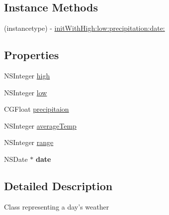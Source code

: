 \subsection*{Instance Methods}
\begin{DoxyCompactItemize}
\item 
(instancetype) -\/ \hyperlink{interface_weather_day_a5a57d195f2f06cb96693b4b4d68fd955}{init\-With\-High\-:low\-:precipitation\-:date\-:}
\end{DoxyCompactItemize}
\subsection*{Properties}
\begin{DoxyCompactItemize}
\item 
N\-S\-Integer \hyperlink{interface_weather_day_a97d5aad192216fe0de9ebc43296cfb68}{high}
\item 
N\-S\-Integer \hyperlink{interface_weather_day_a677798c5423dabd4861214c5de4faf55}{low}
\item 
C\-G\-Float \hyperlink{interface_weather_day_a62a56a8c78976523287185d6dce106e1}{precipitaion}
\item 
N\-S\-Integer \hyperlink{interface_weather_day_aa8f6e94ecfc321ecd17870b606522050}{average\-Temp}
\item 
N\-S\-Integer \hyperlink{interface_weather_day_ade050fc16334cf7cac350d222ff1a026}{range}
\item 
\hypertarget{interface_weather_day_a0217f0a16223b343331a1831eecd97bb}{N\-S\-Date $\ast$ {\bfseries date}}\label{interface_weather_day_a0217f0a16223b343331a1831eecd97bb}

\end{DoxyCompactItemize}


\subsection{Detailed Description}
Class representing a day's weather 

